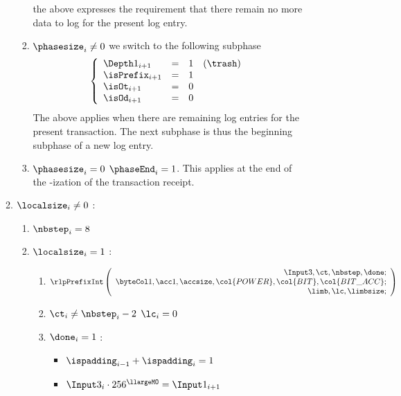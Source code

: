\begin{description}
\begin{enumerate}[resume]
\begin{enumerate}
\begin{enumerate}
								\saNote{} the above expresses the requirement that there remain no more data to log for the present log entry. 
							\item \If $\phasesize_{i} \neq 0$ \Then we switch to the following subphase
								\[
									\left\{ \begin{array}{lclr}
										\Depth 1_{i + 1}   & = & 1 & (\trash) \\
										\isPrefix_{i + 1}  & = & 1 &          \\
										\isOt_{i + 1}      & = & 0 &          \\
										\isOd_{i + 1}      & = & 0 &          \\
									\end{array} \right.
								\]
								\saNote{} The above applies when there are remaining log entries for the present transaction. The next subphase is thus the beginning subphase of a new log entry.
							\item \If $\phasesize_{i}=0$ \Then $\phaseEnd_{i}=1$. \saNote{} This applies at the end of the \rlp{}-ization of the transaction receipt. 
						\end{enumerate}
					\item \If $\localsize_{i} \neq 0$ \Then:
						\begin{enumerate}
							\item $\nbstep_{i}=8$
							\item \If $\localsize_{i} = 1$ \Then:
								\begin{enumerate}
									\item 
										\[
											\rlpPrefixInt
											\left( \begin{array}{r}
												\Input3,
												\ct,
												\nbstep,
												\done; \\
												\byteCol1,
												\acc1,
												\accsize,
												\col{POWER},
												\col{BIT},
												\col{BIT\_ACC}; \\
												\limb,
												\lc,
												\limbsize; \\
											\end{array} \right)
										\]
									\item $\ct_{i} \neq \nbstep_{i}-2$ \Then $\lc_{i}=0$
									\item \If $\done_{i}=1$ \Then:
										\begin{itemize}
											\item $\ispadding_{i-1} + \ispadding_{i} = 1$
											\item $\Input3_{i} \cdot 256^{\llargeMO}= \Input1_{i+1}$

\end{itemize}
\end{enumerate}
\end{enumerate}
\end{enumerate}
\end{enumerate}
\end{description}
